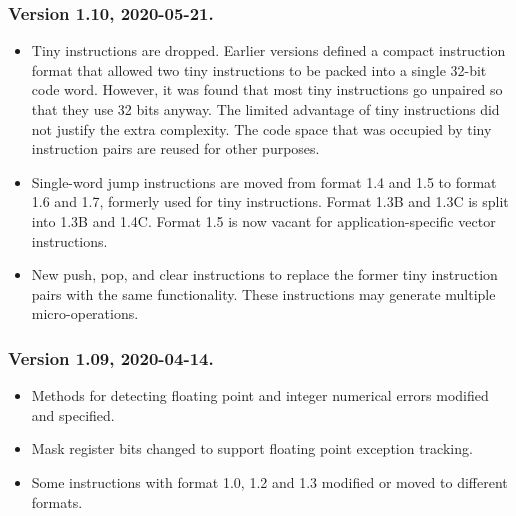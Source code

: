 \documentclass[forwardcom.tex]{subfiles}
\begin{document}
\subsubsection{Version 1.10, 2020-05-21.}

\begin{itemize}
\item Tiny instructions are dropped. Earlier versions defined a compact instruction format that allowed two tiny instructions to be packed into a single 32-bit code word. However, it was found that most tiny instructions go unpaired so that they use 32 bits anyway. The limited advantage of tiny instructions did not justify the extra complexity. The code space that was occupied by tiny instruction pairs are reused for other purposes.

\item Single-word jump instructions are moved from format 1.4 and 1.5 to format 1.6 and 1.7, formerly used for tiny instructions. Format 1.3B and 1.3C is split into 1.3B and 1.4C. Format 1.5 is now vacant for application-specific vector instructions.

\item New push, pop, and clear instructions to replace the former tiny instruction pairs with the same functionality. These instructions may generate multiple micro-operations.

\end{itemize}


\subsubsection{Version 1.09, 2020-04-14.}

\begin{itemize}
\item Methods for detecting floating point and integer numerical errors modified and specified.
\item Mask register bits changed to support floating point exception tracking.
\item Some instructions with format 1.0, 1.2 and 1.3 modified or moved to different formats.
\end{itemize}
\end{document}

